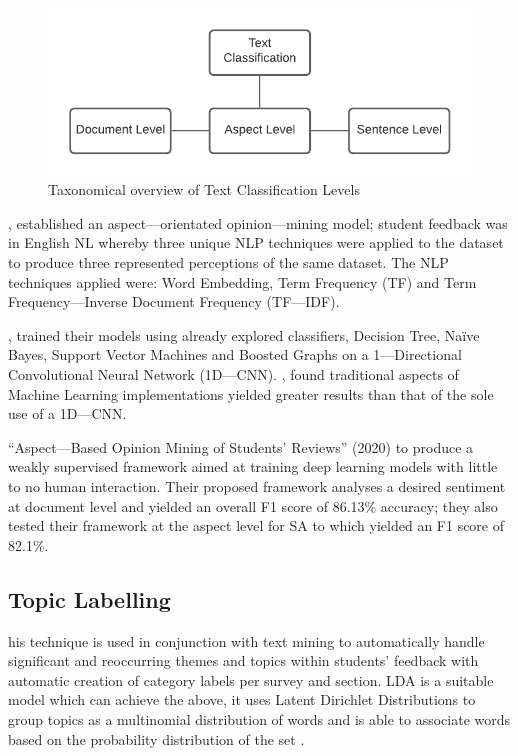 \begin{figure}[H]
    \centering
    \includegraphics[width=\textwidth]{figures/chapter-2/TextClassificationTaxonomy.pdf}
    \caption[Taxonomical overview of Text Classification Levels]{Taxonomical overview of Text Classification Levels}
\end{figure}

\newpage

\textcite{kastrati2020weakly}, established an aspect---orientated opinion---mining model; student feedback was in English NL whereby three unique NLP techniques were applied to the dataset to produce three represented perceptions of the same dataset. The NLP techniques applied were: Word Embedding, Term Frequency (TF) and Term Frequency---Inverse Document Frequency (TF---IDF).

\textcite{kastrati2020weakly}, trained their models using already explored classifiers, Decision Tree, Naïve Bayes, Support Vector Machines and Boosted Graphs on a 1---Directional Convolutional Neural Network (1D---CNN). \textcite{kastrati2020weakly}, found traditional aspects of Machine Learning implementations yielded greater results than that of the sole use of a 1D---CNN.

\textcite{kastrati2020aspect} “Aspect---Based Opinion Mining of Students' Reviews” (2020) to produce a weakly supervised framework aimed at training deep learning models with little to no human interaction. Their proposed framework analyses a desired sentiment at document level and yielded an overall F1 score of 86.13\%  accuracy; they also tested their framework at the aspect level for SA to which yielded an F1 score of 82.1\%.

\subsection{Topic Labelling}

his technique is used in conjunction with text mining to automatically handle significant and reoccurring themes and topics within students’ feedback with automatic creation of category labels per survey and section. LDA is a suitable model which can achieve the above, it uses Latent Dirichlet Distributions to group topics as a multinomial distribution of words and is able to associate words based on the probability distribution of the set \parencite{unankard2019topic}.

